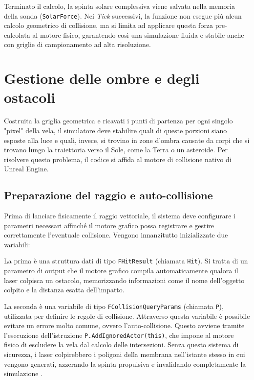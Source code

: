 Terminato il calcolo, la spinta solare complessiva viene salvata nella memoria della sonda (\lstinline|SolarForce|). Nei \textit{Tick} successivi, la funzione non esegue più alcun calcolo geometrico di collisione, ma si limita ad applicare questa forza pre-calcolata al motore fisico, garantendo così una simulazione fluida e stabile anche con griglie di campionamento ad alta risoluzione.


\section{Gestione delle ombre e degli ostacoli}

Costruita la griglia geometrica e ricavati i punti di partenza per ogni singolo "pixel" della vela, il simulatore deve stabilire quali di queste porzioni siano esposte alla luce e quali, invece, si trovino in zone d'ombra causate da corpi che si trovano lungo la traiettoria verso il Sole, come la Terra o un asteroide. Per risolvere questo problema, il codice si affida al motore di collisione nativo di Unreal Engine.


\subsection{Preparazione del raggio e auto-collisione}

Prima di lanciare fisicamente il raggio vettoriale, il sistema deve configurare i parametri necessari affinché il motore grafico possa registrare e gestire correttamente l'eventuale collisione.
Vengono innanzitutto inizializzate due variabili:

La prima è una struttura dati di tipo \lstinline|FHitResult| (chiamata \lstinline|Hit|). Si tratta di un parametro di output che il motore grafico compila automaticamente qualora il laser colpisca un ostacolo, memorizzando informazioni come il nome dell'oggetto colpito e la distanza esatta dell'impatto.

La seconda è una variabile di tipo \lstinline|FCollisionQueryParams| (chiamata \lstinline|P|), utilizzata per definire le regole di collisione. Attraverso questa variabile è possibile evitare un errore molto comune, ovvero l'auto-collisione. Questo avviene tramite l'esecuzione dell'istruzione \lstinline|P.AddIgnoredActor(this)|, che impone al motore fisico di escludere la vela dal calcolo delle intersezioni. Senza questo sistema di sicurezza, i laser colpirebbero i poligoni della membrana nell'istante stesso in cui vengono generati, azzerando la spinta propulsiva e invalidando completamente la simulazione \cite{ericson2004real}.

